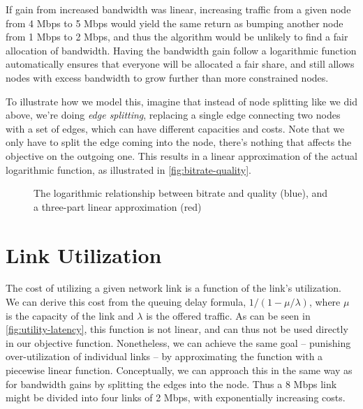 If gain from increased bandwidth was linear, increasing traffic from a given node from 4 Mbps to 5 Mbps would yield the same return as bumping another node from 1 Mbps to 2 Mbps, and thus the algorithm would be unlikely to find a fair allocation of bandwidth. Having the bandwidth gain follow a logarithmic function automatically ensures that everyone will be allocated a fair share, and still allows nodes with excess bandwidth to grow further than more constrained nodes.

To illustrate how we model this, imagine that instead of node splitting like we did above, we're doing \emph{edge splitting}, replacing a single edge connecting two nodes with a set of edges, which can have different capacities and costs. Note that we only have to split the edge coming into the node, there's nothing that affects the objective on the outgoing one. This results in a linear approximation of the actual logarithmic function, as illustrated in \autoref{fig:bitrate-quality}.

\begin{figure}
    \centering


    \caption{The logarithmic relationship between bitrate and quality (blue), and a three-part linear approximation (red)}
    \label{fig:bitrate-quality}
\end{figure}

\section{Link Utilization}

The cost of utilizing a given network link is a function of the link's utilization. We can derive this cost from the queuing delay formula, $1/(1 - \mu/\lambda)$, where $\mu$ is the capacity of the link and $\lambda$ is the offered traffic. As can be seen in \autoref{fig:utility-latency}, this function is not linear, and can thus not be used directly in our objective function. Nonetheless, we can achieve the same goal -- punishing over-utilization of individual links -- by approximating the function with a piecewise linear function. Conceptually, we can approach this in the same way as for bandwidth gains by splitting the edges into the node. Thus a 8 Mbps link might be divided into four links of 2 Mbps, with exponentially increasing costs.

